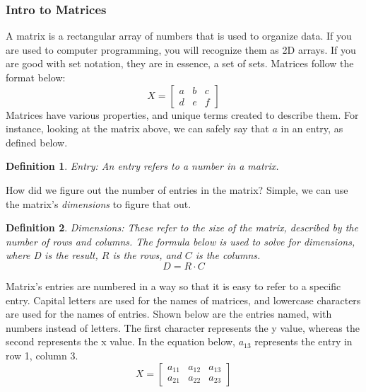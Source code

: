 \documentclass[final,1p,12pt]{elsarticle}
\newtheorem{definition}{Definition}
\begin{document}
        \subsubsection{Intro to Matrices}
        A matrix is a rectangular array of numbers that is used to organize data. If you are used to computer programming, you will recognize them as 2D arrays. If you are good with set notation, they are in essence, a set of sets. Matrices follow the format below:
        \begin{equation}
            X =
            \begin{bmatrix}
                a & b & c \\
                d & e & f
            \end{bmatrix}
        \end{equation}
        Matrices have various properties, and unique terms created to describe them. For instance, looking at the matrix above, we can safely say that $a$ in an entry, as defined below.
        \begin{definition}Entry:
            An entry refers to a number in a matrix.
        \end{definition}
        How did we figure out the number of entries in the matrix? Simple, we can use the matrix's \emph{dimensions} to figure that out.
        \begin{definition}Dimensions:
            These refer to the size of the matrix, described by the number of rows and columns. The formula below is used to solve for dimensions, where D is the result, $R$ is the rows, and $C$ is the columns.
            \begin{equation}
                D = R \cdot C
            \end{equation}
        \end{definition}
        Matrix's entries are numbered in a way so that it is easy to refer to a specific entry. Capital letters are used for the names of matrices, and lowercase characters are used for the names of entries. Shown below are the entries named, with numbers instead of letters. The first character represents the y value, whereas the second represents the x value. In the equation below, $a_{13}$ represents the entry in row 1, column 3.
        \begin{equation}
            X =
            \begin{bmatrix}
                a_{11} & a_{12} & a_{13} \\
                a_{21} & a_{22} & a_{23}
            \end{bmatrix}
        \end{equation}
        
\end{document}

